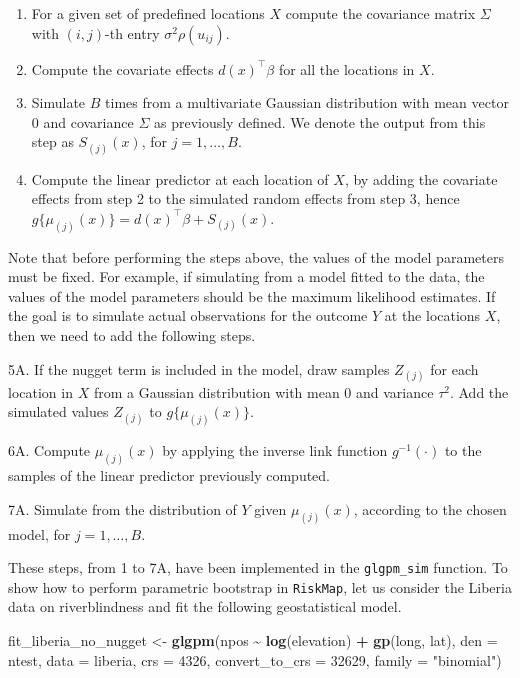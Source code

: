 \documentclass[
  letterpaper,
]{krantz}
\newenvironment{Shaded}{\begin{snugshade}}{\end{snugshade}}
\newcommand{\AttributeTok}[1]{\textcolor[rgb]{0.13,0.29,0.53}{#1}}
\newcommand{\DecValTok}[1]{\textcolor[rgb]{0.00,0.00,0.81}{#1}}
\newcommand{\FunctionTok}[1]{\textcolor[rgb]{0.13,0.29,0.53}{\textbf{#1}}}
\newcommand{\NormalTok}[1]{#1}
\newcommand{\OtherTok}[1]{\textcolor[rgb]{0.56,0.35,0.01}{#1}}
\newcommand{\SpecialCharTok}[1]{\textcolor[rgb]{0.81,0.36,0.00}{\textbf{#1}}}
\newcommand{\StringTok}[1]{\textcolor[rgb]{0.31,0.60,0.02}{#1}}
\begin{document}
\begin{enumerate}
\def\labelenumi{\arabic{enumi}.}
\item
  For a given set of predefined locations \(X\) compute the covariance
  matrix \(\Sigma\) with \((i,j)\)-th entry \(\sigma^2 \rho(u_{ij})\).
\item
  Compute the covariate effects \(d(x)^\top \beta\) for all the
  locations in \(X\).
\item
  Simulate \(B\) times from a multivariate Gaussian distribution with
  mean vector 0 and covariance \(\Sigma\) as previously defined. We
  denote the output from this step as \(S_{(j)}(x)\), for
  \(j = 1, \ldots, B\).
\item
  Compute the linear predictor at each location of \(X\), by adding the
  covariate effects from step 2 to the simulated random effects from
  step 3, hence \(g\{\mu_{(j)}(x)\} = d(x)^\top \beta + S_{(j)}(x)\).
\end{enumerate}

Note that before performing the steps above, the values of the model
parameters must be fixed. For example, if simulating from a model fitted
to the data, the values of the model parameters should be the maximum
likelihood estimates. If the goal is to simulate actual observations for
the outcome \(Y\) at the locations \(X\), then we need to add the
following steps.

5A. If the nugget term is included in the model, draw samples
\(Z_{(j)}\) for each location in \(X\) from a Gaussian distribution with
mean 0 and variance \(\tau^2\). Add the simulated values \(Z_{(j)}\) to
\(g\{\mu_{(j)}(x)\}\).

6A. Compute \(\mu_{(j)}(x)\) by applying the inverse link function
\(g^{-1}(\cdot)\) to the samples of the linear predictor previously
computed.

7A. Simulate from the distribution of \(Y\) given \(\mu_{(j)}(x)\),
according to the chosen model, for \(j = 1, \ldots, B\).

These steps, from 1 to 7A, have been implemented in the
\texttt{glgpm\_sim} function. To show how to perform parametric
bootstrap in \texttt{RiskMap}, let us consider the Liberia data on
riverblindness and fit the following geostatistical model.

\begin{Shaded}
\begin{Highlighting}[]
\NormalTok{fit\_liberia\_no\_nugget }\OtherTok{\textless{}{-}} 
  \FunctionTok{glgpm}\NormalTok{(npos }\SpecialCharTok{\textasciitilde{}} \FunctionTok{log}\NormalTok{(elevation) }\SpecialCharTok{+} \FunctionTok{gp}\NormalTok{(long, lat),}
        \AttributeTok{den =}\NormalTok{ ntest, }\AttributeTok{data =}\NormalTok{ liberia,}
        \AttributeTok{crs =} \DecValTok{4326}\NormalTok{,}
        \AttributeTok{convert\_to\_crs =} \DecValTok{32629}\NormalTok{,}
        \AttributeTok{family =} \StringTok{"binomial"}\NormalTok{)}
\end{Highlighting}
\end{Shaded}
\end{document}
